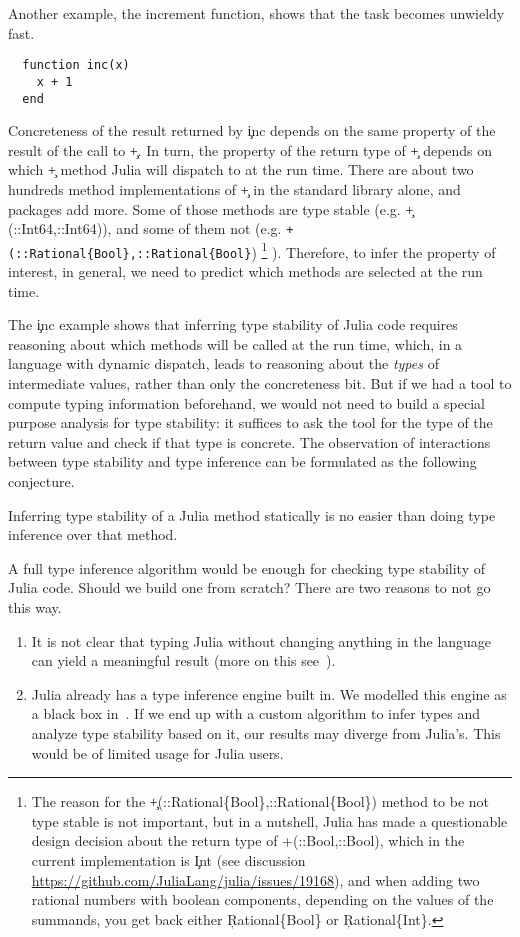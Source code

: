 Another example, the increment function, shows that the task becomes unwieldy fast.
%
\begin{lstlisting}
  function inc(x)
    x + 1
  end
\end{lstlisting}
%
Concreteness of the result returned by \c{inc} depends on the same property of
the result of the call to \c{+}. In turn, the property of the return type of
\c{+} depends on which \c{+} method Julia will dispatch to at the run time.
There are about two hundreds method implementations of \c{+} in the standard
library alone, and packages add more. Some of those methods are type stable
(e.g. \c{+(::Int64,::Int64)}), and some of them not (e.g.
\lstinline|+(::Rational{Bool},::Rational{Bool}|)
\footnote{%
  The reason for the
  \c{+(::Rational\{Bool\},::Rational\{Bool\})} method to be not type
  stable is not important, but in a nutshell, Julia has made a questionable
  design decision about the return type of \c{{+}(::Bool,::Bool)}, which in the
  current implementation is \c{Int}
  (see discussion \url{https://github.com/JuliaLang/julia/issues/19168}),
  and when adding two rational numbers with boolean components, depending on the
  values of the summands, you get back either \c{Rational\{Bool\}} or
  \c{Rational\{Int\}}.}
).
Therefore,
to infer the property of interest, in general,
we need to predict which methods are selected at the run time.

The \c{inc} example shows that inferring type stability of Julia code
requires
reasoning about which methods will be called at the run time, which, in a
language with dynamic dispatch, leads
to reasoning about the \emph{types} of intermediate values, rather than only
the concreteness bit. But if we had a tool to compute typing information
beforehand, we would not need to build a special purpose analysis for type
stability: it suffices to ask the tool for the type of the return value and
check if that type is concrete. The observation of interactions between type
stability and type inference can be formulated as the following conjecture.

\begin{conjecture}
  Inferring type stability of a Julia method statically is no easier than doing type
  inference over that method.
\end{conjecture}

A full type inference algorithm would be enough for checking type stability of
Julia code. Should we build one from scratch? There are two reasons to
not go this way.
\begin{enumerate}

  \item It is not clear that typing Julia without changing anything in the
  language can yield a meaningful result (more on this
  see~\cite{Chung23}).

  \item Julia already has a type inference engine built in. We modelled this
        engine as a black box in~. If we end up with a
        custom algorithm to infer types and analyze type stability based on it,
        our results may diverge from Julia's. This would be of limited usage for
        Julia users.
\end{enumerate}

